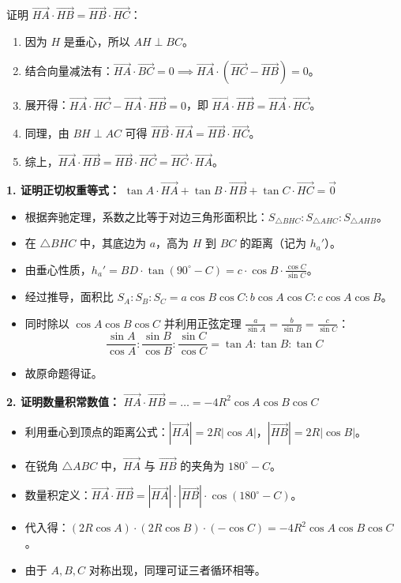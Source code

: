 \begin{proofbox}
证明 $\vec{HA} \cdot \vec{HB} = \vec{HB} \cdot \vec{HC}$：
\begin{enumerate}
    \item 因为 $H$ 是垂心，所以 $AH \perp BC$。
    \item 结合向量减法有：$\vec{HA} \cdot \vec{BC} = 0 \implies \vec{HA} \cdot (\vec{HC} - \vec{HB}) = 0$。
    \item 展开得：$\vec{HA} \cdot \vec{HC} - \vec{HA} \cdot \vec{HB} = 0$，即 $\vec{HA} \cdot \vec{HB} = \vec{HA} \cdot \vec{HC}$。
    \item 同理，由 $BH \perp AC$ 可得 $\vec{HB} \cdot \vec{HA} = \vec{HB} \cdot \vec{HC}$。
    \item 综上，$\vec{HA} \cdot \vec{HB} = \vec{HB} \cdot \vec{HC} = \vec{HC} \cdot \vec{HA}$。
\end{enumerate}
\end{proofbox}

\begin{proofbox}
\textbf{1. 证明正切权重等式：}
$\tan A \cdot \vec{HA} + \tan B \cdot \vec{HB} + \tan C \cdot \vec{HC} = \vec{0}$
\begin{itemize}
    \item 根据奔驰定理，系数之比等于对边三角形面积比：$S_{\triangle BHC} : S_{\triangle AHC} : S_{\triangle AHB}$。
    \item 在 $\triangle BHC$ 中，其底边为 $a$，高为 $H$ 到 $BC$ 的距离（记为 $h_a'$）。
    \item 由垂心性质，$h_a' = BD \cdot \tan(90^\circ-C) = c \cdot \cos B \cdot \frac{\cos C}{\sin C}$。
    \item 经过推导，面积比 $S_A:S_B:S_C = a \cos B \cos C : b \cos A \cos C : c \cos A \cos B$。
    \item 同时除以 $\cos A \cos B \cos C$ 并利用正弦定理 $\frac{a}{\sin A} = \frac{b}{\sin B} = \frac{c}{\sin C}$：
    \[ \frac{\sin A}{\cos A} : \frac{\sin B}{\cos B} : \frac{\sin C}{\cos C} = \tan A : \tan B : \tan C \]
    \item 故原命题得证。
\end{itemize}
\end{proofbox}


\begin{proofbox}
\textbf{2. 证明数量积常数值：}
$\vec{HA} \cdot \vec{HB} = \dots = -4R^2 \cos A \cos B \cos C$
\begin{itemize}
    \item 利用垂心到顶点的距离公式：$|\vec{HA}| = 2R |\cos A|$，$|\vec{HB}| = 2R |\cos B|$。
    \item 在锐角 $\triangle ABC$ 中，$\vec{HA}$ 与 $\vec{HB}$ 的夹角为 $180^\circ - C$。
    \item 数量积定义：$\vec{HA} \cdot \vec{HB} = |\vec{HA}| \cdot |\vec{HB}| \cdot \cos(180^\circ - C)$。
    \item 代入得：$(2R \cos A) \cdot (2R \cos B) \cdot (-\cos C) = -4R^2 \cos A \cos B \cos C$。
    \item 由于 $A, B, C$ 对称出现，同理可证三者循环相等。
\end{itemize}
\end{proofbox}

